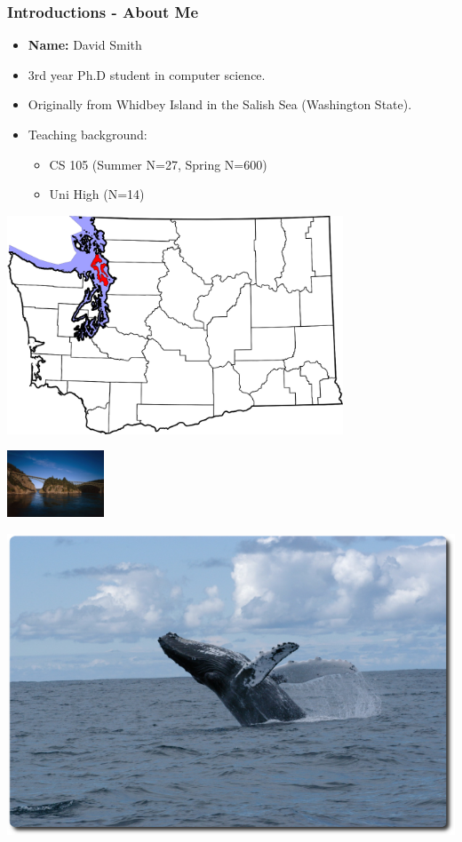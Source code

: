 \documentclass{beamer}
\begin{document}
\begin{frame}
  \frametitle{Introductions - About Me}
  \begin{minipage}{0.39\textwidth}
    \begin{itemize}
      \item \textbf{Name: }David Smith 
      \item 3rd year Ph.D student in computer science.
      \item Originally from Whidbey Island in the Salish Sea (Washington State).
      \item Teaching background:
          \begin{itemize}
              \item CS 105 (Summer N=27, Spring N=600)
              \item Uni High (N=14)
          \end{itemize}
    \end{itemize}
  \end{minipage}
  \begin{minipage}{0.59\textwidth}
    \centering
    \includegraphics[width=0.75\textwidth]{imgs/islandcounty.png}
    \vfill
    \begin{minipage}{0.49\textwidth}
      \includegraphics[width=\textwidth, height=75px]{imgs/roundeddeception.jpg}
    \end{minipage}
    \begin{minipage}{0.49\textwidth}
      \includegraphics[width=\textwidth]{imgs/roundedgreywhale.pdf}

\end{minipage}
\end{minipage}
\end{frame}
\end{document}
